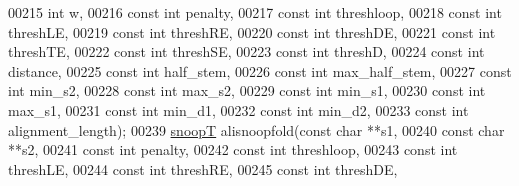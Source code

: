 \begin{DoxyCode}
00215                                 \textcolor{keywordtype}{int} w, 
00216                                 \textcolor{keyword}{const} \textcolor{keywordtype}{int} penalty,
00217                                 \textcolor{keyword}{const} \textcolor{keywordtype}{int} threshloop, 
00218                                 \textcolor{keyword}{const} \textcolor{keywordtype}{int} threshLE,
00219                                 \textcolor{keyword}{const} \textcolor{keywordtype}{int} threshRE,
00220                                 \textcolor{keyword}{const} \textcolor{keywordtype}{int} threshDE,
00221                                 \textcolor{keyword}{const} \textcolor{keywordtype}{int} threshTE,
00222                                 \textcolor{keyword}{const} \textcolor{keywordtype}{int} threshSE,
00223                                 \textcolor{keyword}{const} \textcolor{keywordtype}{int} threshD,
00224                                 \textcolor{keyword}{const} \textcolor{keywordtype}{int} distance,
00225                                 \textcolor{keyword}{const} \textcolor{keywordtype}{int} half\_stem,
00226                                 \textcolor{keyword}{const} \textcolor{keywordtype}{int} max\_half\_stem,
00227                                 \textcolor{keyword}{const} \textcolor{keywordtype}{int} min\_s2,
00228                                 \textcolor{keyword}{const} \textcolor{keywordtype}{int} max\_s2,
00229                                 \textcolor{keyword}{const} \textcolor{keywordtype}{int} min\_s1,
00230                                 \textcolor{keyword}{const} \textcolor{keywordtype}{int} max\_s1,
00231                                 \textcolor{keyword}{const} \textcolor{keywordtype}{int} min\_d1,
00232                                 \textcolor{keyword}{const} \textcolor{keywordtype}{int} min\_d2,
00233                                 \textcolor{keyword}{const} \textcolor{keywordtype}{int} alignment\_length);
00239 \hyperlink{group__data__structures_structsnoopT}{snoopT} alisnoopfold(\textcolor{keyword}{const} \textcolor{keywordtype}{char} **s1,
00240                     \textcolor{keyword}{const} \textcolor{keywordtype}{char} **s2, 
00241                     \textcolor{keyword}{const} \textcolor{keywordtype}{int} penalty,
00242                     \textcolor{keyword}{const} \textcolor{keywordtype}{int} threshloop,
00243                     \textcolor{keyword}{const} \textcolor{keywordtype}{int} threshLE,
00244                     \textcolor{keyword}{const} \textcolor{keywordtype}{int} threshRE,
00245                     \textcolor{keyword}{const} \textcolor{keywordtype}{int} threshDE,

\end{DoxyCode}
